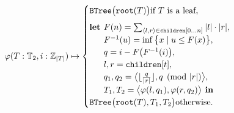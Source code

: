 \documentclass[sigplan,nonacm]{acmart}\settopmatter{printfolios=false,printccs=false,printacmref=false}
\begin{document}
\begin{small}
\begin{equation*}\label{eq:pairing}
\varphi(T: \mathbb{T}_2, i: \mathbb{Z}_{|T|}) \mapsto \begin{cases}
\texttt{BTree}\big(\texttt{root}(T)\big) \text{if $T$ is a leaf,} \vspace{5pt}\\
\textbf{let } F(n) = \sum_{\langle l, r\rangle \in \texttt{children}[0 \ldots n]}|l|\cdot|r|,\\
\phantom{\textbf{let }} F^{-1}(u)=\inf \big\{x \mid u \leq F(x)\big\},\\
\phantom{\textbf{let }} q=i - F\big(F^{-1}(i)\big),\\
\phantom{\textbf{let }} l, r = \texttt{children}[t],\\
\phantom{\textbf{let }} q_1, q_2 =\big\langle\lfloor\frac{q}{|r|}\rfloor, q \pmod{|r|}\big\rangle,\\
\phantom{\textbf{let }} T_1, T_2 = \big\langle\varphi(l, q_1), \varphi(r, q_2)\big\rangle \textbf{ in } \\
\texttt{BTree}\big(\texttt{root}(T), T_1, T_2\big) \text{otherwise.} \\
\end{cases}
\end{equation*}
\end{small}

\end{document}

